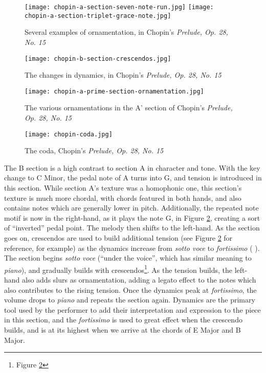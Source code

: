 \begin{figure}[h]
  \centering
  \texttt{[image: chopin-a-section-seven-note-run.jpg]}
  \texttt{[image: chopin-a-section-triplet-grace-note.jpg]}
  \caption{Several examples of ornamentation, in Chopin's \textit{Prelude, Op. 28, No. 15}}
  \label{fig:chopin-a-section-examples-ornamentation}
\end{figure}

\begin{figure}
  \centering
  \texttt{[image: chopin-b-section-crescendos.jpg]}
  \caption{The changes in dynamics, in Chopin's \textit{Prelude, Op. 28, No. 15}}
  \label{fig:chopin-b-section-crescendos}
\end{figure}

\begin{figure}
  \centering
  \texttt{[image: chopin-a-prime-section-ornamentation.jpg]}
  \caption[Ornamentations in A', Chopin's \textit{Prelude, Op. 28, No. 15}]{The various ornamentations in the A' section of Chopin's \textit{Prelude, Op. 28, No. 15}}
  \label{fig:chopin-a-prime-section-ornamentation}
\end{figure}

\begin{figure}
  \centering
  \texttt{[image: chopin-coda.jpg]}
  \caption{The coda, Chopin's \textit{Prelude, Op. 28, No. 15}}
  \label{fig:chopin-coda}
\end{figure}



The B section is a high contrast to section A in character and tone. With the key change to C\musSharp{} Minor, the pedal note of A\musFlat{} turns into G\musSharp{}, and tension is introduced in this section. While section A's texture was a homophonic one, this section's texture is much more chordal, with chords featured in both hands, and also contains notes which are generally lower in pitch. Additionally, the repeated note motif is now in the right-hand, as it plays the note G\musSharp{}, in Figure \ref{fig:chopin-b-section-crescendos}\autocite{Hansen_1973}, creating a sort of ``inverted'' pedal point. The melody then shifts to the left-hand. As the section goes on, crescendos are used to build additional tension (see Figure \ref{fig:chopin-b-section-crescendos}\autocite{Hansen_1973} for reference, for example) as the dynamics increase from \textit{sotto voce} to \textit{fortissimo} ( ). The section begins \textit{sotto voce} (``under the voice'', which has similar meaning to \textit{piano}), and gradually builds with crescendos\footnote{Figure \ref{fig:chopin-b-section-crescendos}}\autocite{Hansen_1973}. As the tension builds, the left-hand also adds slurs as ornamentation, adding a legato effect to the notes which also contributes to the rising tension. Once the dynamics peak at \textit{fortissimo}, the volume drops to \textit{piano} and repeats the section again. Dynamics are the primary tool used by the performer to add their interpretation and expression to the piece in this section, and the \textit{fortissimo} is used to great effect when the crescendo builds, and is at its highest when we arrive at the chords of E Major and B Major.

